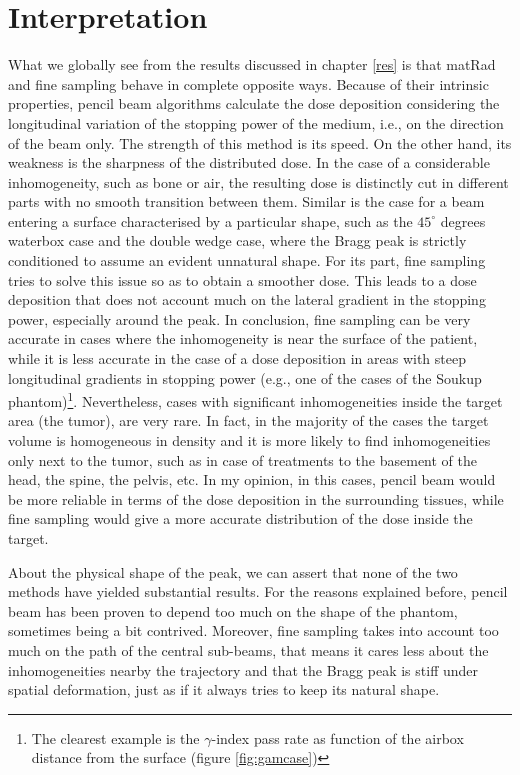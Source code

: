 \documentclass[12pt, a4paper, twoside]{book}
\begin{document}
\section{Interpretation}
What we globally see from the results discussed in chapter \ref{res} is that matRad and fine sampling behave in complete opposite ways. Because of their intrinsic properties, pencil beam algorithms calculate the dose deposition considering the longitudinal variation of the stopping power of the medium, i.e., on the direction of the beam only. The strength of this method is its speed. On the other hand, its weakness is the sharpness of the distributed dose. In the case of a considerable inhomogeneity, such as bone or air, the resulting dose is distinctly cut in different parts with no smooth transition between them. Similar is the case for a beam entering a surface characterised by a particular shape, such as the $45^\circ$ degrees waterbox case and the double wedge case, where the Bragg peak is strictly conditioned to assume an evident unnatural shape.
For its part, fine sampling tries to solve this issue so as to obtain a smoother dose. This leads to a dose deposition that does not account much on the lateral gradient in the stopping power, especially around the peak.
In conclusion, fine sampling can be very accurate in cases where the inhomogeneity is near the surface of the patient, while it is less accurate in the case of a dose deposition in areas with steep longitudinal gradients in stopping power (e.g., one of the cases of the Soukup phantom)\footnote{The clearest example is the $\gamma$-index pass rate as function of the airbox distance from the surface (figure \ref{fig:gamcase})}. Nevertheless, cases with significant inhomogeneities inside the target area (the tumor), are very rare. In fact, in the majority of the cases the target volume is homogeneous in density and it is more likely to find inhomogeneities only next to the tumor, such as in case of treatments to the basement of the head, the spine, the pelvis, etc. In my opinion, in this cases, pencil beam would be more reliable in terms of the dose deposition in the surrounding tissues, while fine sampling would give a more accurate distribution of the dose inside the target.


About the physical shape of the peak, we can assert that none of the two methods have yielded substantial results. For the reasons explained before, pencil beam has been proven to depend too much on the shape of the phantom, sometimes being a bit contrived. Moreover, fine sampling takes into account too much on the path of the central sub-beams, that means it cares less about the inhomogeneities nearby the trajectory and that the Bragg peak is stiff under spatial deformation, just as if it always tries to keep its natural shape.
\end{document}
